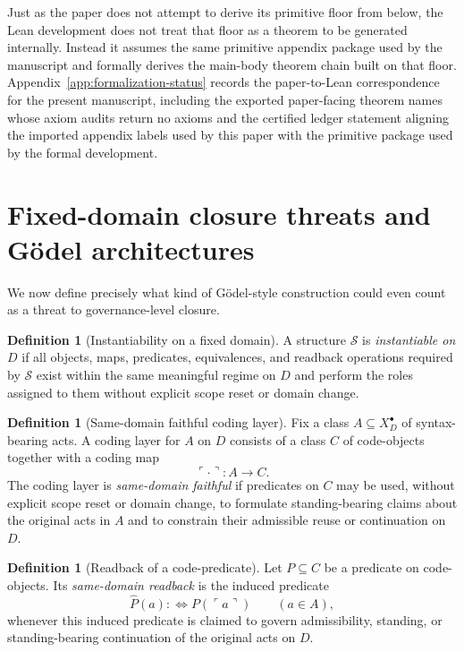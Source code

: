 \documentclass[11pt]{article}
\theoremstyle{plain}
\theoremstyle{definition}
\newtheorem{definition}[theorem]{Definition}
\newcommand{\code}[1]{\ulcorner #1 \urcorner}
\newcommand{\Eval}{X_D^{\bullet}}
\newcommand{\domain}{D}
\begin{document}
Just as the paper does not attempt to derive its primitive floor from below, the Lean development does not treat that floor as a theorem to be generated internally. Instead it assumes the same primitive appendix package used by the manuscript and formally derives the main-body theorem chain built on that floor. Appendix~\ref{app:formalization-status} records the paper-to-Lean correspondence for the present manuscript, including the exported paper-facing theorem names whose axiom audits return no axioms and the certified ledger statement aligning the imported appendix labels used by this paper with the primitive package used by the formal development.

\section{Fixed-domain closure threats and G\"odel architectures}
\label{sec:threats}

We now define precisely what kind of G\"odel-style construction could even count as a threat to governance-level closure.

\begin{definition}[Instantiability on a fixed domain]
A structure $\mathcal{S}$ is \emph{instantiable on $\domain$} if all objects, maps, predicates, equivalences, and readback operations required by $\mathcal{S}$ exist within the same meaningful regime on $\domain$ and perform the roles assigned to them without explicit scope reset or domain change.
\end{definition}

\begin{definition}[Same-domain faithful coding layer]
Fix a class $A \subseteq \Eval$ of syntax-bearing acts. A coding layer for $A$ on $\domain$ consists of a class $C$ of code-objects together with a coding map
\[
\code{\cdot}:A\to C.
\]
The coding layer is \emph{same-domain faithful} if predicates on $C$ may be used, without explicit scope reset or domain change, to formulate standing-bearing claims about the original acts in $A$ and to constrain their admissible reuse or continuation on $\domain$.
\end{definition}

\begin{definition}[Readback of a code-predicate]
Let $P\subseteq C$ be a predicate on code-objects. Its \emph{same-domain readback} is the induced predicate
\[
\widehat P(a):\Longleftrightarrow P(\code{a})
\qquad (a\in A),
\]
whenever this induced predicate is claimed to govern admissibility, standing, or standing-bearing continuation of the original acts on $\domain$.
\end{definition}
\end{document}
